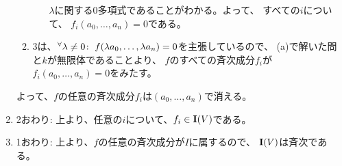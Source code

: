 \begin{myproof}
\begin{enumerate}
\begin{enumerate}
\begin{enumerate}[label=(演習2-7-\alph*)]
        $\lambda$に関する0多項式であることがわかる。よって、
        すべての$i$について、
        $f_i(a_0,\dots,a_n) = 0$である。
      \end{enumerate}
      \item
      3は、${}^{\forall}{\lambda \neq 0}\mathrm{\colon\;}f(\lambda a_0,\dots,\lambda a_n) = 0$を主張しているので、
      (a)で解いた問と$k$が無限体であることより、
      $f$のすべての斉次成分$f_i$が$f_i(a_0,\dots,a_n)=0$をみたす。
    \end{enumerate}
    よって、$f$の任意の斉次成分$f_i$は$(a_0,\dots,a_n)$で消える。
    \item
    2おわり: 上より、任意の$i$について、$f_i \in \textbf I(V)$である。
    \item
    1おわり: 上より、$f$の任意の斉次成分が$I$に属するので、
    $\textbf I(V)$は斉次である。
  \end{enumerate}
\end{myproof}

